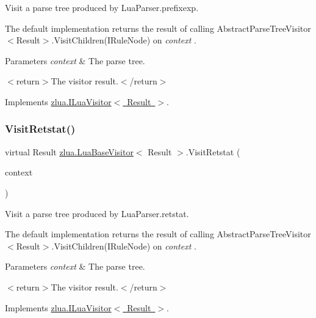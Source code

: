 Visit a parse tree produced by Lua\+Parser.\+prefixexp. 

The default implementation returns the result of calling Abstract\+Parse\+Tree\+Visitor$<$\+Result$>$.\+Visit\+Children(\+I\+Rule\+Node) on {\itshape context} . 


\begin{DoxyParams}{Parameters}
{\em context} & The parse tree.\\
\hline
\end{DoxyParams}
$<$return$>$The visitor result.$<$/return$>$ 

Implements \mbox{\hyperlink{interfacezlua_1_1_i_lua_visitor_a76880eb7fdd84285caa8759ecabd8aca}{zlua.\+I\+Lua\+Visitor$<$ Result $>$}}.

\mbox{\label{classzlua_1_1_lua_base_visitor_ab7354e58a007e8352ef5be6a0f31a3ad}} 
\subsubsection{\texorpdfstring{Visit\+Retstat()}{VisitRetstat()}}
{\footnotesize\ttfamily virtual Result \mbox{\hyperlink{classzlua_1_1_lua_base_visitor}{zlua.\+Lua\+Base\+Visitor}}$<$ Result $>$.Visit\+Retstat (\begin{DoxyParamCaption}\item[{\mbox{[}\+Not\+Null\mbox{]} \mbox{\hyperlink{classzlua_1_1_lua_parser_1_1_retstat_context}{Lua\+Parser.\+Retstat\+Context}}}]{context }\end{DoxyParamCaption})\hspace{0.3cm}{\ttfamily [virtual]}}



Visit a parse tree produced by Lua\+Parser.\+retstat. 

The default implementation returns the result of calling Abstract\+Parse\+Tree\+Visitor$<$\+Result$>$.\+Visit\+Children(\+I\+Rule\+Node) on {\itshape context} . 


\begin{DoxyParams}{Parameters}
{\em context} & The parse tree.\\
\hline
\end{DoxyParams}
$<$return$>$The visitor result.$<$/return$>$ 

Implements \mbox{\hyperlink{interfacezlua_1_1_i_lua_visitor_a0cba8f1a92102af4f881132e17be76f2}{zlua.\+I\+Lua\+Visitor$<$ Result $>$}}.


